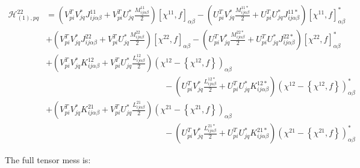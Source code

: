 \documentclass[a4paper,12pt]{book}
\begin{document}
\begin{align*}
\mathcal{H}_{(1),pq}^{22} &= \left(V_{pi}^T V^*_{jq} J_{ij\alpha\beta}^{11} + V_{pi}^T U^*_{jq} \frac{M_{ij\alpha\beta}^{11}}{2} \right)[\chi^{11},f]_{\alpha\beta} -
 \left(U_{pi}^T V^*_{jq} \frac{M_{ij\alpha\beta}^{11*}}{2} + U_{pi}^T U^*_{jq} J_{ij\alpha\beta}^{11*}  \right)[\chi^{11},f]^*_{\alpha\beta} \\
&+ \left(V_{pi}^T V^*_{jq} J_{ij\alpha\beta}^{22} + V_{pi}^T U^*_{jq} \frac{M_{ij\alpha\beta}^{22}}{2} \right)[\chi^{22},f]_{\alpha\beta} -
 \left(U_{pi}^T V^*_{jq} \frac{M_{ij\alpha\beta}^{22*}}{2} + U_{pi}^T U^*_{jq} J_{ij\alpha\beta}^{22*}  \right)[\chi^{22},f]^*_{\alpha\beta} \\
&+ \left(V_{pi}^T V^*_{jq} K_{ij\alpha\beta}^{12} + V_{pi}^T U^*_{jq} \frac{L_{ij\alpha\beta}^{12}}{2} \right)\left(\chi^{12}-\left\{\chi^{12},f\right\}\right)_{\alpha\beta} \\ &\qquad\qquad\qquad\qquad\qquad\qquad\qquad-
 \left(U_{pi}^T V^*_{jq} \frac{L_{ij\alpha\beta}^{12*}}{2} + U_{pi}^T U^*_{jq} K_{ij\alpha\beta}^{12*}  \right)\left(\chi^{12}-\left\{\chi^{12},f\right\}\right)^*_{\alpha\beta} \\
&+ \left(V_{pi}^T V^*_{jq} K_{ij\alpha\beta}^{21} + V_{pi}^T U^*_{jq} \frac{L_{ij\alpha\beta}^{21}}{2} \right)\left(\chi^{21}-\left\{\chi^{21},f\right\}\right)_{\alpha\beta} \\ &\qquad\qquad\qquad\qquad\qquad\qquad\qquad-
 \left(U_{pi}^T V^*_{jq} \frac{L_{ij\alpha\beta}^{21*}}{2} + U_{pi}^T U^*_{jq} K_{ij\alpha\beta}^{21*}  \right)\left(\chi^{21}-\left\{\chi^{21},f\right\}\right)^*_{\alpha\beta}
\end{align*}

The full tensor mess is:
\end{document}
